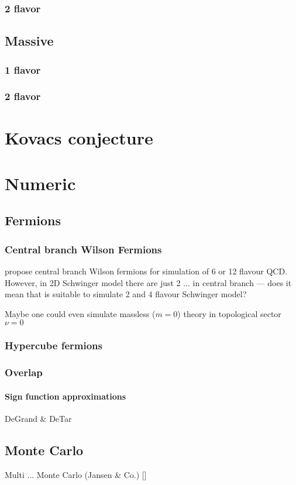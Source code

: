 \documentclass[12pt,a4paper]{report}
\begin{document}
\subsection{2 flavor}

\section{Massive}

\subsection{1 flavor}

\subsection{2 flavor}


\chapter{Kovacs conjecture}



\chapter{Numeric}

\section{Fermions}

\subsection{Central branch Wilson Fermions}

\cite{Misumi2020a} propose central branch Wilson fermions for simulation of 6 or 12 flavour QCD. However, in 2D Schwinger model there are just 2 ... in central branch --- does it mean that is suitable to simulate 2 and 4 flavour Schwinger model?

Maybe one could even simulate massless ($m = 0$) theory in topological sector $\nu = 0$ 

\subsection{Hypercube fermions}

\subsection{Overlap}

\subsubsection{Sign function approximations}

DeGrand \& DeTar

\section{Monte Carlo}

Multi ... Monte Carlo (Jansen \& Co.) []

\nocite{*}



\end{document}
